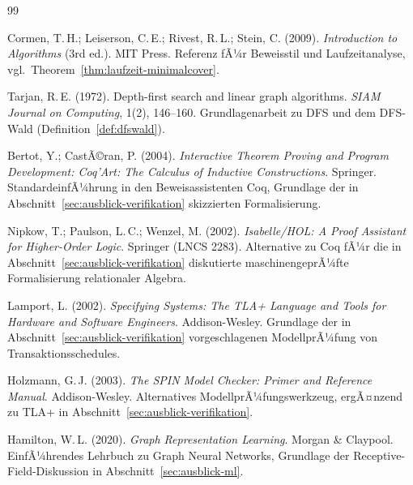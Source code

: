 ﻿\documentclass[a4paper,12pt]{report}
\theoremstyle{definition}
\theoremstyle{remark}
\begin{document}
\begin{thebibliography}{99}

Cormen, T.\,H.; Leiserson, C.\,E.; Rivest, R.\,L.; Stein, C. (2009).
\newblock \emph{Introduction to Algorithms} (3rd ed.).
\newblock MIT Press.
\newblock Referenz fÃ¼r Beweisstil und Laufzeitanalyse, vgl.\
Theorem~\ref{thm:laufzeit-minimalcover}.

Tarjan, R.\,E. (1972).
\newblock Depth-first search and linear graph algorithms.
\newblock \emph{SIAM Journal on Computing}, 1(2), 146--160.
\newblock Grundlagenarbeit zu DFS und dem DFS-Wald
(Definition~\ref{def:dfswald}).

Bertot, Y.; CastÃ©ran, P. (2004).
\newblock \emph{Interactive Theorem Proving and Program Development:
Coq'Art: The Calculus of Inductive Constructions}.
\newblock Springer.
\newblock StandardeinfÃ¼hrung in den Beweisassistenten Coq, Grundlage
der in Abschnitt~\ref{sec:ausblick-verifikation} skizzierten
Formalisierung.

Nipkow, T.; Paulson, L.\,C.; Wenzel, M. (2002).
\newblock \emph{Isabelle/HOL: A Proof Assistant for Higher-Order Logic}.
\newblock Springer (LNCS 2283).
\newblock Alternative zu Coq fÃ¼r die in
Abschnitt~\ref{sec:ausblick-verifikation} diskutierte
maschinengeprÃ¼fte Formalisierung relationaler Algebra.

Lamport, L. (2002).
\newblock \emph{Specifying Systems: The TLA+ Language and Tools for
Hardware and Software Engineers}.
\newblock Addison-Wesley.
\newblock Grundlage der in Abschnitt~\ref{sec:ausblick-verifikation}
vorgeschlagenen ModellprÃ¼fung von Transaktionsschedules.

Holzmann, G.\,J. (2003).
\newblock \emph{The SPIN Model Checker: Primer and Reference Manual}.
\newblock Addison-Wesley.
\newblock Alternatives ModellprÃ¼fungswerkzeug, ergÃ¤nzend zu TLA+ in
Abschnitt~\ref{sec:ausblick-verifikation}.


Hamilton, W.\,L. (2020).
\newblock \emph{Graph Representation Learning}.
\newblock Morgan \& Claypool.
\newblock EinfÃ¼hrendes Lehrbuch zu Graph Neural Networks, Grundlage
der Receptive-Field-Diskussion in
Abschnitt~\ref{sec:ausblick-ml}.


\end{thebibliography}
\end{document}
